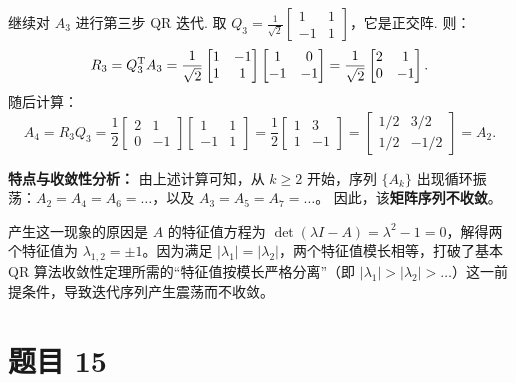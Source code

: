 \documentclass{article}
\begin{document}
\begin{solution}
  继续对 $A_3$ 进行第三步 QR 迭代.
  取 $Q_3 = \frac{1}{\sqrt{2}}
  \begin{bmatrix} 1 & 1 \\ -1 & 1
  \end{bmatrix}$，它是正交阵. 则：
  \[
    R_3 = Q_3^{\mathrm{T}} A_3 = \frac{1}{\sqrt{2}}
    \begin{bmatrix} 1 & -1 \\ 1 & 1
    \end{bmatrix}
    \begin{bmatrix} 1 & 0 \\ -1 & -1
    \end{bmatrix} = \frac{1}{\sqrt{2}}
    \begin{bmatrix} 2 & 1 \\ 0 & -1
    \end{bmatrix}.
  \]
  随后计算：
  \[
    A_4 = R_3 Q_3 = \frac{1}{2}
    \begin{bmatrix} 2 & 1 \\ 0 & -1
    \end{bmatrix}
    \begin{bmatrix} 1 & 1 \\ -1 & 1
    \end{bmatrix} = \frac{1}{2}
    \begin{bmatrix} 1 & 3 \\ 1 & -1
    \end{bmatrix} =
    \begin{bmatrix} 1/2 & 3/2 \\ 1/2 & -1/2
    \end{bmatrix} = A_2.
  \]

  \textbf{特点与收敛性分析：}
  由上述计算可知，从 $k \ge 2$ 开始，序列 $\{A_k\}$ 出现循环振荡：$A_2 = A_4 = A_6 =
  \dots$，以及 $A_3 = A_5 = A_7 = \dots$。
  因此，该\textbf{矩阵序列不收敛}。

  产生这一现象的原因是 $A$ 的特征值方程为 $\operatorname{det}(\lambda I - A) =
  \lambda^2 - 1 = 0$，解得两个特征值为 $\lambda_{1, 2} = \pm 1$。因为满足
  $|\lambda_1| = |\lambda_2|$，两个特征值模长相等，打破了基本 QR
  算法收敛性定理所需的“特征值按模长严格分离”（即 $|\lambda_1| > |\lambda_2| >
  \dots$）这一前提条件，导致迭代序列产生震荡而不收敛。

\end{solution}

\section{题目 15}
\end{document}
